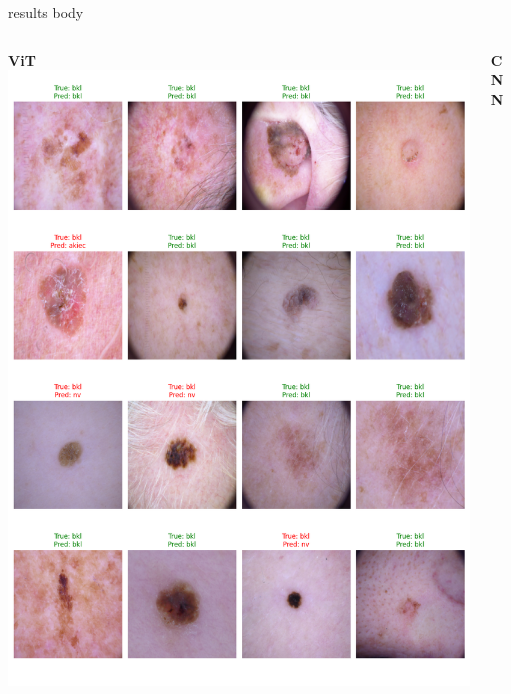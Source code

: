 \documentclass[final]{beamer}
\begin{document}
\begin{frame}[t]
\begin{columns}[T]
\begin{column}{.49\linewidth}
{\begin{beamercolorbox}[wd=\linewidth,dp=0.3cm]{results body}
                \begin{columns}[T]
                    \begin{column}{.48\linewidth}
                        \centering
                        \small \textbf{ViT}
                        \includegraphics[width=\linewidth]{figures/sample_predictions_vit.png}
                    \end{column}
                    \begin{column}{.48\linewidth}
                        \centering
                        \small \textbf{CNN}

\end{column}
\end{columns}
\end{beamercolorbox}}
\end{column}
\end{columns}
\end{frame}
\end{document}
